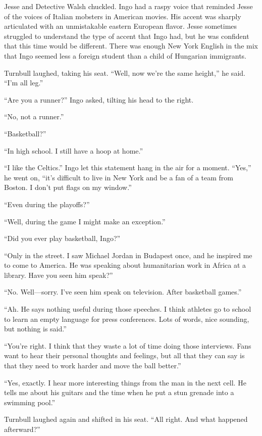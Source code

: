\documentclass[12pt]{book}
\begin{document}
Jesse and Detective Walsh chuckled.  Ingo had a raspy voice that reminded Jesse of the voices of Italian mobsters in American movies.  His accent was sharply articulated with an unmistakable eastern European flavor.  Jesse sometimes struggled to understand the type of accent that Ingo had, but he was confident that this time would be different.  There was enough New York English in the mix that Ingo seemed less a foreign student than a child of Hungarian immigrants.

Turnbull laughed, taking his seat.  ``Well, now we're the same height,'' he said.  ``I'm all leg.''

``Are you a runner?'' Ingo asked, tilting his head to the right.

``No, not a runner.''

``Basketball?''

``In high school.  I still have a hoop at home.''

``I like the Celtics.''  Ingo let this statement hang in the air for a moment.  ``Yes,'' he went on, ``it's difficult to live in New York and be a fan of a team from Boston.  I don't put flags on my window.''

``Even during the playoffs?''

``Well, during the game I might make an exception.''

``Did you ever play basketball, Ingo?''

``Only in the street.  I saw Michael Jordan in Budapest once, and he inspired me to come to America.  He was speaking about humanitarian work in Africa at a library.  Have you seen him speak?''

``No.  Well---sorry.  I've seen him speak on television.  After basketball games.''

``Ah.  He says nothing useful during those speeches.  I think athletes go to school to learn an empty language for press conferences.  Lots of words, nice sounding, but nothing is said.''

``You're right.  I think that they waste a lot of time doing those interviews.  Fans want to hear their personal thoughts and feelings, but all that they can say is that they need to work harder and move the ball better.''

``Yes, exactly.  I hear more interesting things from the man in the next cell.  He tells me about his guitars and the time when he put a stun grenade into a swimming pool.''

Turnbull laughed again and shifted in his seat.  ``All right.  And what happened afterward?''
\end{document}
